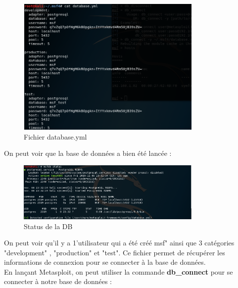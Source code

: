 
\begin{figure}[htp!]
  \centering
  \setlength\figureheight{7cm}
  \setlength\figurewidth{9cm}
  \includegraphics[width=0.8\textwidth]{oui/Ancien/imangeancien/metasploit/database.PNG}
  \caption{Fichier database.yml}
  \label{fig:courbe-tikz}
\end{figure}


\noindent On peut voir que la base de données a bien été lancée :

\begin{figure}[htp!]
  \centering
  \setlength\figureheight{7cm}
  \setlength\figurewidth{9cm}
  \includegraphics[width=0.8\textwidth]{oui/Ancien/imangeancien/metasploit/db_status1.PNG}
  \caption{Status de la DB}
  \label{fig:courbe-tikz}
\end{figure}

\noindent On peut voir qu'il y a 1'utilisateur qui a été créé msf" ainsi que 3 catégories "development" , "production" et "test". Ce fichier permet de récupérer les informations de connexion pour se connecter à la base de données.\\

\noindent En lançant Metasploit, on peut utiliser la commande \textbf{db\_connect} pour se connecter à notre base de données :

